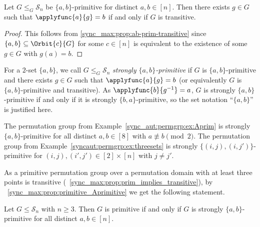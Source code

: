 \begin{corollary}\label{sync_max:prop:ab-prim-transitive}
	Let $G \le_G \mathcal S_n$ be $\{a,b\}$-primitive for distinct $a,b \in [n]$.
	Then there exists $g \in G$
	such that $\applyfunc{a}{g} = b$ if and only if $G$
	is transitive.
\end{corollary}
\begin{proof}
	This follows from \cref{sync_max:prop:ab-prim-transitive}
	since $\{a,b\} \subseteq \Orbit{c}{G}$ for some $c \in [n]$
	is equivalent to the existence of some $g \in G$ with $g(a) = b$.
\end{proof}

For a $2$-set $\{a,b\}$,
we call $G \le_G \mathcal S_n$ \emph{strongly $\{a,b\}$-primitive}
if $G$ is $\{a,b\}$-primitive and there exists
$g \in G$ such that $\applyfunc{a}{g} = b$ (or equivalently $G$
is $\{a,b\}$-primitive and transitive).
As 
$\applyfunc{b}{g^{-1}} = a$, $G$ is strongly $\{a,b\}$-primitive
if and only if it is strongly $\{b,a\}$-primitive,
so the set notation ``$\{a,b\}$''
is justified here.

\begin{example}
	The permutation group
	from Example~\ref{sync_aut:permgrp:ex:Aprim} 
	is strongly $\{a,b\}$-primitive
	for all distinct $a,b \in [8]$
	with $a \not\equiv b \pmod{2}$.
	The permutation group from Example~\ref{syncaut:permgrp:ex:threesets}
	is strongly $\{ (i,j), (i,j') \}$-primitive
	for $(i,j), (i',j') \in [2] \times [n]$
	with $j \ne j'$.
\end{example} 

As a primitive permutation group over a permutation domain with at least three
points is transitive (\PROP~\ref{sync_max:prop:prim_implies_transitive}), by \PROP~\ref{sync_max:prop:primitive_Aprimitive}
we get the following statement.

\begin{proposition}
	\label{sync_max:prop:prim_stronglyabprim}
	Let $G \le \mathcal S_n$ with $n \ge 3$.
	Then $G$ is primitive if and only if $G$ is strongly $\{a,b\}$-primitive
	for all distinct $a,b \in [n]$.
\end{proposition}
